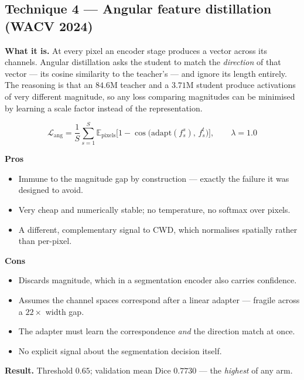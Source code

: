 \documentclass[11pt]{article}
\newcommand{\pro}[1]{\item[\textcolor{proscol}{$+$}] #1}
\newcommand{\con}[1]{\item[\textcolor{conscol}{$-$}] #1}
\begin{document}
\subsection{Technique 4 --- Angular feature distillation (WACV 2024)}

\textbf{What it is.} At every pixel an encoder stage produces a vector across its channels.
Angular distillation asks the student to match the \emph{direction} of that vector --- its cosine
similarity to the teacher's --- and ignore its length entirely. The reasoning is that an $84.6$M
teacher and a $3.71$M student produce activations of very different magnitude, so any loss
comparing magnitudes can be minimised by learning a scale factor instead of the representation.

\[
  \mathcal{L}_{\mathrm{ang}}=\frac{1}{S}\sum_{s=1}^{S}
  \mathbb{E}_{\text{pixels}}\Big[1-\cos\big(\mathrm{adapt}(f^s_s),\,f^t_s\big)\Big],
  \qquad \lambda=1.0
\]

\begin{minipage}[t]{0.475\textwidth}
\textbf{\textcolor{proscol}{Pros}}
\begin{itemize}[leftmargin=1.5em,itemsep=1pt,label={},labelwidth=1em,labelsep=0.4em,align=left]
  \pro{Immune to the magnitude gap by construction --- exactly the failure it was designed to
       avoid.}
  \pro{Very cheap and numerically stable; no temperature, no softmax over pixels.}
  \pro{A different, complementary signal to CWD, which normalises spatially rather than
       per-pixel.}
\end{itemize}
\end{minipage}\hfill%
\begin{minipage}[t]{0.475\textwidth}
\textbf{\textcolor{conscol}{Cons}}
\begin{itemize}[leftmargin=1.5em,itemsep=1pt,label={},labelwidth=1em,labelsep=0.4em,align=left]
  \con{Discards magnitude, which in a segmentation encoder also carries confidence.}
  \con{Assumes the channel spaces correspond after a linear adapter --- fragile across a
       $22\times$ width gap.}
  \con{The adapter must learn the correspondence \emph{and} the direction match at once.}
  \con{No explicit signal about the segmentation decision itself.}
\end{itemize}
\end{minipage}

\vspace{6pt}
\textbf{Result.} Threshold $0.65$; validation mean Dice $0.7730$ --- the \emph{highest} of any arm.
\end{document}
